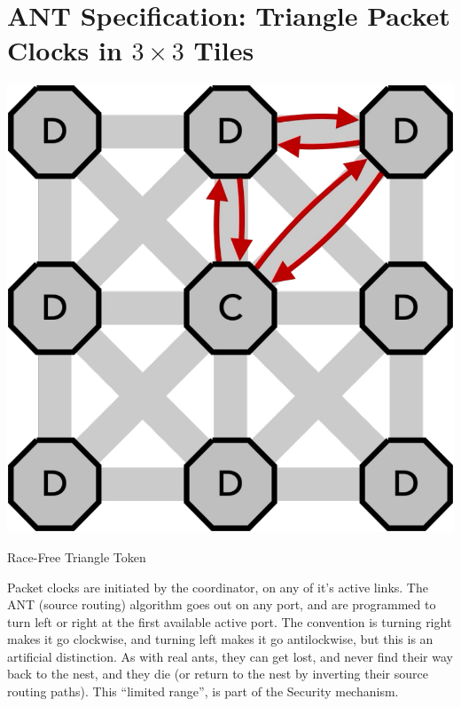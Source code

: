 \section{ANT Specification: Triangle Packet Clocks in $3 \times 3$ Tiles}
 \begin{marginfigure}
        \includegraphics[width=\linewidth]{../../FIGURES/Triangle-clock.pdf} %
  \caption{Race-Free Triangle Token}
    \vspace{10pt}
\end{marginfigure}

Packet clocks are initiated by the coordinator, on any of it's active links.  The ANT (source routing) algorithm goes out on any port, and are programmed to turn left or right at the first available active port.  The convention is turning right makes it go clockwise, and turning left makes it go antilockwise, but this is an artificial distinction. As with real ants, they can get lost, and never find their way back to the nest, and they die (or return to the nest by inverting their source routing paths). This ``limited range'', is part of the Security mechanism. 

